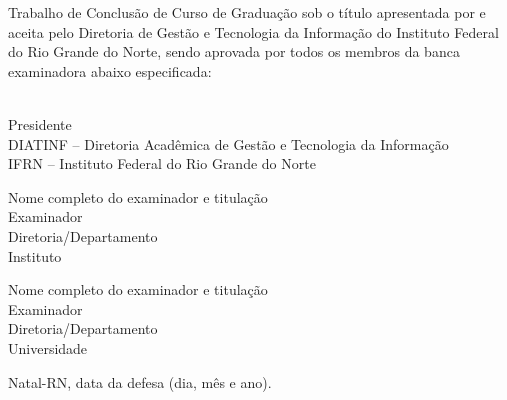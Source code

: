 \begin{folhadeaprovacao}
	\setlength{\ABNTsignthickness}{0.4pt}
	\setlength{\ABNTsignwidth}{10cm}

	\noindent
	Trabalho de Conclusão de Curso de Graduação sob o título
	\textit{\myThesis} apresentada por \myName{ }e aceita pelo Diretoria
	de Gestão e Tecnologia da Informação do Instituto Federal do Rio Grande do
	Norte, sendo aprovada por todos os membros da banca examinadora abaixo especificada:

	\assinatura
	{
	{\mySupervisorName}   			                  \\
	{\small Presidente}											          \smallskip\\
	{\footnotesize
	DIATINF -- Diretoria Acadêmica de Gestão e Tecnologia da Informação		   \\
	IFRN -- Instituto Federal do Rio Grande do Norte
	}
	}

	\assinatura
	{
	Nome completo do examinador e titulação   			                  \\
	{\small Examinador}											          \smallskip\\
	{\footnotesize
	Diretoria/Departamento		\\
	Instituto
	}
	}

	\assinatura
	{
	Nome completo do examinador e titulação   			                  \\
	{\small Examinador}											          \smallskip\\
	{\footnotesize
	Diretoria/Departamento		\\
	Universidade
	}
	}

	\vfill

	\begin{center}
		Natal-RN, data da defesa (dia, mês e ano).
	\end{center}
\end{folhadeaprovacao}
